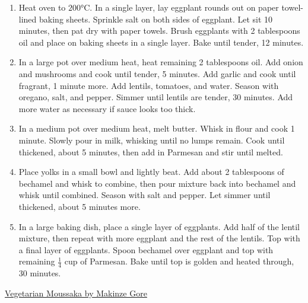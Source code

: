 \documentclass[11pt,a4paper]{article}
\begin{document}
\begin{enumerate}
  \item Heat oven to $200\si{\celsius}$. In a single layer, lay eggplant rounds out on paper towel-lined baking sheets. Sprinkle salt on both sides of eggplant. Let sit 10 minutes, then pat dry with paper towels. Brush eggplants with 2 tablespoons oil and place on baking sheets in a single layer. Bake until tender, 12 minutes.
  \item In a large pot over medium heat, heat remaining 2 tablespoons oil. Add onion and mushrooms and cook until tender, 5 minutes. Add garlic and cook until fragrant, 1 minute more. Add lentils, tomatoes, and water. Season with oregano, salt, and pepper. Simmer until lentils are tender, 30 minutes. Add more water as necessary if sauce looks too thick.
  \item In a medium pot over medium heat, melt butter. Whisk in flour and cook 1 minute. Slowly pour in milk, whisking until no lumps remain. Cook until thickened, about 5 minutes, then add in Parmesan and stir until melted.
  \item Place yolks in a small bowl and lightly beat. Add about 2 tablespoons of bechamel and whisk to combine, then pour mixture back into bechamel and whisk until combined. Season with salt and pepper. Let simmer until thickened, about 5 minutes more.
  \item In a large baking dish, place a single layer of eggplants. Add half of the lentil mixture, then repeat with more eggplant and the rest of the lentils. Top with a final layer of eggplants. Spoon bechamel over eggplant and top with remaining $\frac{1}{4}$ cup of Parmesan. Bake until top is golden and heated through, 30 minutes.
\end{enumerate}

\href{https://www.delish.com/cooking/recipe-ideas/a30876085/vegetarian-moussaka-recipe/}{Vegetarian Moussaka by Makinze Gore}
\end{document}
